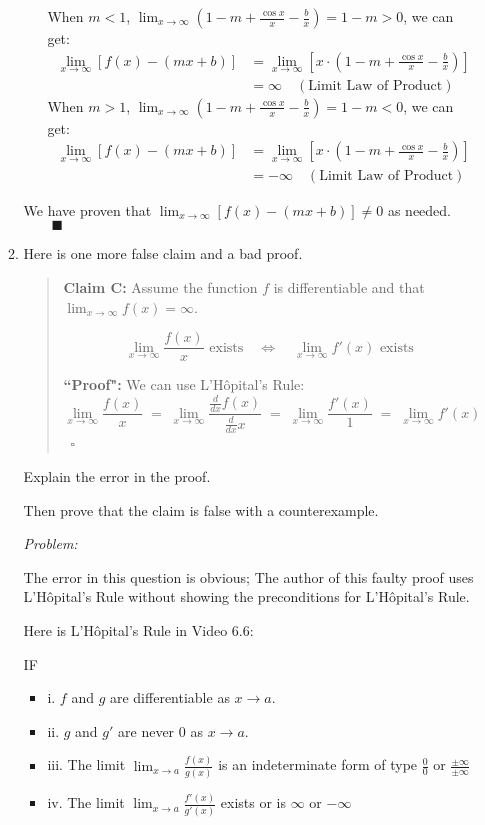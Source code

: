 \documentclass[12pt]{exam}
\newcommand {\DS} [1] {${\displaystyle #1}$}
\newcommand{\vv}{\vspace{.1cm}}
\begin{document}
\begin{enumerate}
\begin{enumerate}
\begin{itemize}
		    When $m<1$, $\lim_{x \to \infty}(1-m+\frac{\cos{x}}{x}-\frac{b}{x})=1-m>0$, we can get:
		    \begin{align*}
		        \lim_{x \to \infty}[f(x)-(mx+b)]&=\lim_{x \to \infty}[x\cdot(1-m+\frac{\cos{x}}{x}-\frac{b}{x})]\\
		        &=\infty\quad(\mbox{Limit Law of Product})
		    \end{align*}
		    When $m>1$, $\lim_{x \to \infty}(1-m+\frac{\cos{x}}{x}-\frac{b}{x})=1-m<0$, we can get:
		    \begin{align*}
		         \lim_{x \to \infty}[f(x)-(mx+b)]&=\lim_{x \to \infty}[x\cdot(1-m+\frac{\cos{x}}{x}-\frac{b}{x})]\\
		        &=-\infty\quad(\mbox{Limit Law of Product})
		    \end{align*}
		\end{itemize}
		We have proven that $\lim_{x \to \infty}[f(x)-(mx+b)]\neq0$ as needed. $\qquad\blacksquare$
		
		\newpage
		
		\item  Here is one more false claim and a bad proof.
			\begin{quotation}
				\noindent
				{\bf Claim C:} Assume the function $f$ is differentiable and that \DS{\lim_{x \to \infty} f(x) = \infty}.
				
				$$  \lim_{x \to \infty} \frac{f(x)}{x} \mbox{ exists} \quad \iff \quad \lim_{x \to \infty} f'(x) \mbox{ exists } $$
				
				
				\noindent
				{\bf ``Proof":}  We can use L'H\^{o}pital's Rule:
					$$
						\lim_{x \to \infty} \frac{f(x)}{x} \; = \; \lim_{x \to \infty} \frac{\frac{d}{dx} f(x)}{\frac{d}{dx} x} 
							\; = \; \lim_{x \to \infty} \frac{f'(x)}{1} \; = \; \lim_{x \to \infty} f'(x)
					$$
					\ \hfill $\square$
			\end{quotation}
			Explain the  error in the proof.
			
			Then prove that the claim is false with a counterexample.
			
			\vv
			
			\emph{Problem:}
			
			\vv
			
			The error in this question is obvious; The author of this faulty proof uses L'H\^{o}pital's Rule without showing the preconditions for L'H\^{o}pital's Rule.
			
			Here is L'H\^{o}pital's Rule in Video 6.6:
			
			IF
			\begin{itemize}
			    \item i. $f$ and $g$ are differentiable as $x \to a$.
			    \item ii. $g$ and $g'$ are never $0$ as $x \to a$.
			    \item iii. The limit $\lim_{x \to a}\frac{f(x)}{g(x)}$ is an indeterminate form of type $\frac{0}{0}$ or $\frac{\pm\infty}{\pm\infty}$
			    \item iv. The limit $\lim_{x \to a}\frac{f'(x)}{g'(x)}$ exists or is $\infty$ or $-\infty$
			    

\end{itemize}
\end{enumerate}
\end{enumerate}
\end{document}
